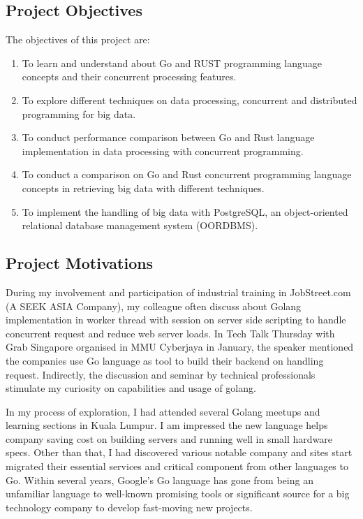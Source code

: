 \pagebreak
\subsection{Project Objectives}
The objectives of this project are:


\begin{enumerate}[topsep=0pt,itemsep=-1ex,partopsep=1ex,parsep=1.5ex]

	\item To learn and understand about Go and RUST programming language concepts and their concurrent processing features. 
	\item To explore different techniques on data processing, concurrent and distributed programming for big data.  
	\item To conduct performance comparison between Go and Rust language implementation in data processing with concurrent programming.
	\item To conduct a comparison on Go and Rust concurrent programming language concepts in retrieving big data with different techniques. 
	\item To implement the handling of big data with PostgreSQL, an object-oriented relational database management system (OORDBMS).

\end{enumerate}

\pagebreak

\subsection{Project Motivations}

During my involvement and participation of industrial training in JobStreet.com (A SEEK ASIA Company), my colleague often discuss about Golang implementation in worker thread with session on server side scripting to handle concurrent request and reduce web server loads. In Tech Talk Thursday with Grab Singapore organised in MMU Cyberjaya in January, the speaker mentioned the companies use Go language as tool to build their backend on handling request. Indirectly, the discussion and seminar by technical professionals stimulate my curiosity on capabilities and usage of golang.

In my process of exploration, I had attended several Golang meetups and learning sections in Kuala Lumpur. I am impressed the new language helps company saving cost on building servers and running well in small hardware specs. Other than that, I had discovered various notable company and sites start migrated their essential services and critical component from other languages to Go. Within several years, Google’s Go language has gone from being an unfamiliar language to well-known promising tools or significant source for a big technology company to develop fast-moving new projects.

